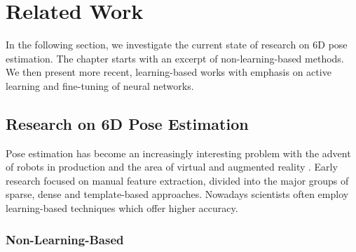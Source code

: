 \chapter{Related Work}

In the following section, we investigate the current state of research on 6D pose estimation. The chapter starts with an excerpt of non-learning-based methods. We then present more recent, learning-based works with emphasis on active learning and fine-tuning of neural networks.

\section{Research on 6D Pose Estimation}

Pose estimation has become an increasingly interesting problem with the advent of robots in production and the area of virtual and augmented reality \cite{bb8}. Early research focused on manual feature extraction, divided into the major groups of sparse, dense and template-based approaches. Nowadays scientists often employ learning-based techniques which offer higher accuracy.

\subsection{Non-Learning-Based}

